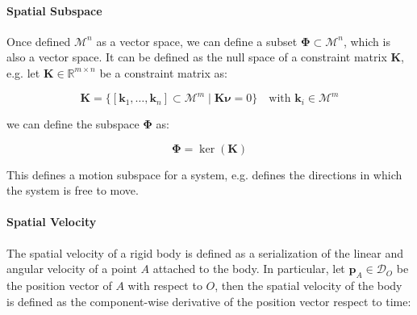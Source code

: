 \begin{figure}
\end{figure}

\paragraph{Spatial Subspace} Once defined $\mathcal{M} ^n$ as a vector space, we can define a subset $\boldsymbol{\Phi} \subset \mathcal{M} ^n$, which is also a vector space. It can be defined as
the null space of a constraint matrix $\mathbf{K}$, e.g. let $\mathbf{K} \in \mathbb{R} ^{m \times n}$ be a constraint matrix as:

\begin{equation}
    \mathbf{K} = \{ [\mathbf{k} _1, \dots, \mathbf{k} _n]  \subset \mathcal{M} ^m \mid \mathbf{K} \boldsymbol{\nu} = 0 \} \quad \text{with } \mathbf{k} _i \in \mathcal{M} ^m
\end{equation}

we can define the subspace $\boldsymbol{\Phi}$ as:

\begin{equation}
    \boldsymbol{\Phi} = \ker (\mathbf{K})
\end{equation}

This defines a motion subspace for a system, e.g. defines the directions in which the system is free to move.

\paragraph{Spatial Velocity} The spatial velocity of a rigid body is defined as a serialization of the linear and angular velocity of a point $A$ attached to the body. In particular, let $\mathbf{p} _A \in \mathcal{D}_O$ be the position vector of $A$ with respect to $O$, then the spatial velocity of the body is defined as the component-wise derivative of the position vector respect to time:

